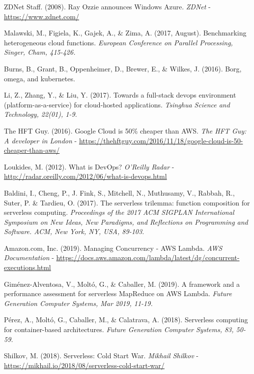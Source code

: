 \documentclass[11pt,spanish,listoffigures]{tfgetsinf}
\begin{document}
\begin{thebibliography}{10}
  	ZDNet Staff. (2008).
	\newblock Ray Ozzie announces Windows Azure. 
	\newblock \textit{ZDNet}
	\newblock - \url{https://www.zdnet.com/}

  	Malawski, M., Figiela, K., Gajek, A., \& Zima, A. (2017, August).
	\newblock Benchmarking heterogeneous cloud functions.
	\newblock \textit{European Conference on Parallel Processing, Singer, Cham, 415-426.}

  	Burns, B., Grant, B., Oppenheimer, D., Brewer, E., \& Wilkes, J. (2016).
	\newblock Borg, omega, and kubernetes.

  Li, Z., Zhang, Y., \& Liu, Y. (2017).
	\newblock Towards a full-stack devops environment (platform-as-a-service) for cloud-hosted applications.
	\newblock \textit{Tsinghua Science and Technology, 22(01), 1-9.}

  	The HFT Guy. (2016).
	\newblock Google Cloud is 50\% cheaper than AWS.
	\newblock \textit{The HFT Guy: A developer in London}
	\newblock - \url{https://thehftguy.com/2016/11/18/google-cloud-is-50-cheaper-than-aws/}

  	Loukides, M. (2012).
	\newblock What is DevOps?
	\newblock \textit{O'Reilly Radar}
	\newblock - \url{http://radar.oreilly.com/2012/06/what-is-devops.html}

  	Baldini, I., Cheng, P., J. Fink, S., Mitchell, N., Muthusamy, V., Rabbah, R., Suter, P. \& Tardieu, O. (2017).
	\newblock The serverless trilemma: function composition for serverless computing.
	\newblock \textit{Proceedings of the 2017 ACM SIGPLAN International Symposium on New Ideas, New Paradigms, and Reflections on Programming and Software. ACM, New York, NY, USA, 89-103.}

  	Amazon.com, Inc. (2019).
	\newblock Managing Concurrency - AWS Lambda.
	\newblock \textit{AWS Documentation}
	\newblock - \url{https://docs.aws.amazon.com/lambda/latest/dg/concurrent-executions.html}
	
  	Giménez-Alventosa, V., Moltó, G., \& Caballer, M. (2019).
	\newblock A framework and a performance assessment for serverless MapReduce on AWS Lambda.
	\newblock \textit{Future Generation Computer Systems, Mar 2019, 11-19.}

  	Pérez, A., Moltó, G., Caballer, M., \& Calatrava, A. (2018).
	\newblock Serverless computing for container-based architectures.
	\newblock \textit{Future Generation Computer Systems, 83, 50-59.}

  	Shilkov, M. (2018).
	\newblock Serverless: Cold Start War. 
	\newblock \textit{Mikhail Shilkov}
	\newblock - \url{https://mikhail.io/2018/08/serverless-cold-start-war/}

\end{thebibliography}
\cleardoublepage
\end{document}
